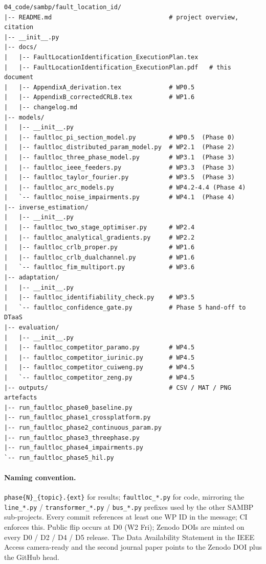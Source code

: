 \documentclass[11pt,a4paper]{article}
\begin{document}
\begin{verbatim}
04_code/sambp/fault_location_id/
|-- README.md                                # project overview, citation
|-- __init__.py
|-- docs/
|   |-- FaultLocationIdentification_ExecutionPlan.tex
|   |-- FaultLocationIdentification_ExecutionPlan.pdf   # this document
|   |-- AppendixA_derivation.tex             # WP0.5
|   |-- AppendixB_correctedCRLB.tex          # WP1.6
|   |-- changelog.md
|-- models/
|   |-- __init__.py
|   |-- faultloc_pi_section_model.py         # WP0.5  (Phase 0)
|   |-- faultloc_distributed_param_model.py  # WP2.1  (Phase 2)
|   |-- faultloc_three_phase_model.py        # WP3.1  (Phase 3)
|   |-- faultloc_ieee_feeders.py             # WP3.3  (Phase 3)
|   |-- faultloc_taylor_fourier.py           # WP3.5  (Phase 3)
|   |-- faultloc_arc_models.py               # WP4.2-4.4 (Phase 4)
|   `-- faultloc_noise_impairments.py        # WP4.1  (Phase 4)
|-- inverse_estimation/
|   |-- __init__.py
|   |-- faultloc_two_stage_optimiser.py      # WP2.4
|   |-- faultloc_analytical_gradients.py     # WP2.2
|   |-- faultloc_crlb_proper.py              # WP1.6
|   |-- faultloc_crlb_dualchannel.py         # WP1.6
|   `-- faultloc_fim_multiport.py            # WP3.6
|-- adaptation/
|   |-- __init__.py
|   |-- faultloc_identifiability_check.py    # WP3.5
|   `-- faultloc_confidence_gate.py          # Phase 5 hand-off to DTaaS
|-- evaluation/
|   |-- __init__.py
|   |-- faultloc_competitor_paramo.py        # WP4.5
|   |-- faultloc_competitor_iurinic.py       # WP4.5
|   |-- faultloc_competitor_cuiweng.py       # WP4.5
|   `-- faultloc_competitor_zeng.py          # WP4.5
|-- outputs/                                 # CSV / MAT / PNG artefacts
|-- run_faultloc_phase0_baseline.py
|-- run_faultloc_phase1_crossplatform.py
|-- run_faultloc_phase2_continuous_param.py
|-- run_faultloc_phase3_threephase.py
|-- run_faultloc_phase4_impairments.py
`-- run_faultloc_phase5_hil.py
\end{verbatim}

\paragraph{Naming convention.}
\texttt{phase\{N\}\_\{topic\}.\{ext\}} for results;
\texttt{faultloc\_*.py} for code, mirroring the
\texttt{line\_*.py} / \texttt{transformer\_*.py} / \texttt{bus\_*.py}
prefixes used by the other SAMBP sub-projects.  Every commit references
at least one WP ID in the message; CI enforces this.  Public flip occurs
at D0 (W2 Fri); Zenodo DOIs are minted on every D0 / D2 / D4 / D5
release.  The Data Availability Statement in the IEEE Access camera-ready
and the second journal paper points to the Zenodo DOI plus the GitHub
head.
\end{document}
